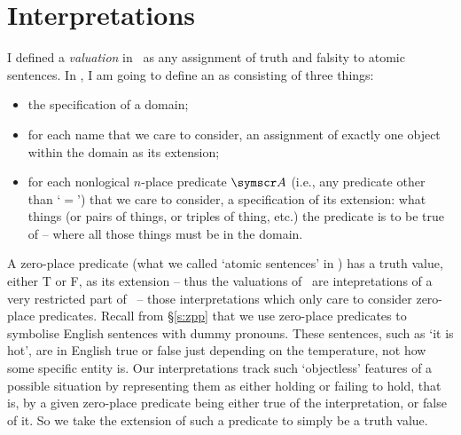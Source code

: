 \section{Interpretations} \label{ss.int}
I defined a \emph{valuation} in \TFL\ as any assignment of truth and falsity to atomic sentences. In \FOL, I am going to define an  as consisting of three things:
	\begin{itemize}	
		\item the specification of a domain;
		\item for each name that we care to consider, an assignment of exactly one object within the domain as its extension;
		\item for each nonlogical $n$-place predicate $\meta{A}$ (i.e., any predicate other than `$=$') that we care to consider, a specification of its extension: what things (or pairs of things, or triples of thing, etc.) the predicate is to be true of – where all those things must be in the domain.
	\end{itemize}

A zero-place predicate (what we called `atomic sentences' in \TFL) has a truth value, either T or F, as its extension – thus the valuations of \TFL\ are intepretations of a very restricted part of \FOL\ – those interpretations which only care to consider zero-place predicates. Recall from §\ref{s:zpp} that we use zero-place predicates to symbolise English sentences with dummy pronouns. These sentences, such as `it is hot', are in English true or false just depending on the temperature, not how some specific entity is. Our interpretations track such `objectless' features of a possible situation by representing them as either holding or failing to hold, that is, by a given zero-place predicate being either true of the interpretation, or false of it. So we take the extension of such a predicate to simply be a truth value.

